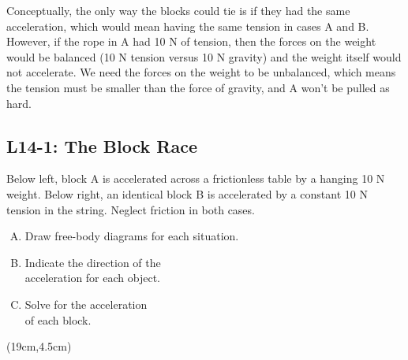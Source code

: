\documentclass[]{article}
\newcommand{\Week}{14}
\begin{document}
\begin{TeacherMargin}
\noindent Conceptually, the only way the blocks could tie is if they had the same acceleration, which would mean having the same tension in cases A and B. However, if the rope in A had 10 N of tension, then the forces on the weight would be balanced (10 N tension versus 10 N gravity) and the weight itself would not accelerate. We need the forces on the weight to be unbalanced, which means the tension must be smaller than the force of gravity, and A won't be pulled as hard.
\end{TeacherMargin}
\begin{PresentSpace}
\vspace{-10pt}
\section*{L\Week-1: The Block Race}
\vspace{-10pt}
Below left, block A is accelerated across a frictionless table by a hanging 10 N weight. Below right, an identical block B is accelerated by a constant 10 N tension in the string. Neglect friction in both cases.
\begin{enumerate}[(A)]
	\item Draw free-body diagrams for each situation.
	\item Indicate the direction of the \\
	acceleration for each object.
	\item Solve for the acceleration \\
	of each block.
\end{enumerate}
\end{PresentSpace}
\begin{textblock*}{5cm}(19cm,4.5cm)
\begin{center}
	\Large
\end{center}
\end{textblock*}
\end{document}
